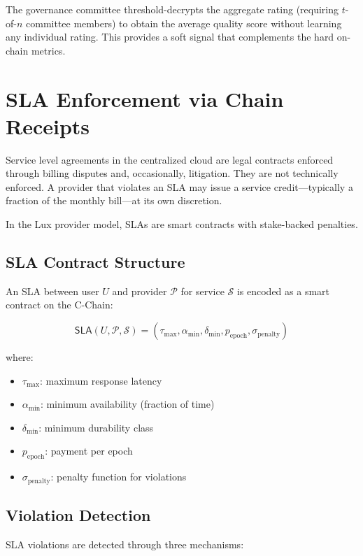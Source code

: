 \documentclass[11pt,a4paper]{article}
\begin{document}
The governance committee threshold-decrypts the aggregate rating (requiring
$t$-of-$n$ committee members) to obtain the average quality score without
learning any individual rating. This provides a soft signal that complements
the hard on-chain metrics.

\section{SLA Enforcement via Chain Receipts}\label{sec:sla}

Service level agreements in the centralized cloud are legal contracts enforced
through billing disputes and, occasionally, litigation. They are not technically
enforced. A provider that violates an SLA may issue a service credit---typically
a fraction of the monthly bill---at its own discretion.

In the Lux provider model, SLAs are smart contracts with stake-backed penalties.

\subsection{SLA Contract Structure}

An SLA between user $U$ and provider $\mathcal{P}$ for service $\mathcal{S}$
is encoded as a smart contract on the C-Chain:

\begin{equation}
    \mathsf{SLA}(U, \mathcal{P}, \mathcal{S}) = (\tau_{\max}, \alpha_{\min}, \delta_{\min}, p_{\text{epoch}}, \sigma_{\text{penalty}})
\end{equation}

where:
\begin{itemize}
    \item $\tau_{\max}$: maximum response latency
    \item $\alpha_{\min}$: minimum availability (fraction of time)
    \item $\delta_{\min}$: minimum durability class
    \item $p_{\text{epoch}}$: payment per epoch
    \item $\sigma_{\text{penalty}}$: penalty function for violations
\end{itemize}

\subsection{Violation Detection}

SLA violations are detected through three mechanisms:
\end{document}
